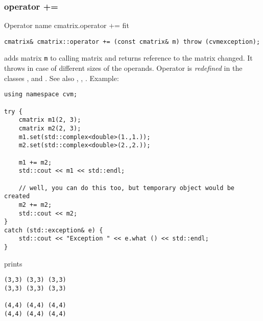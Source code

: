 \subsubsection{operator +=}
Operator%
\pdfdest name {cmatrix.operator +=} fit
\begin{verbatim}
cmatrix& cmatrix::operator += (const cmatrix& m) throw (cvmexception);
\end{verbatim}
adds  matrix \verb"m" to  calling matrix 
and returns  reference to
the matrix changed.
It throws  
in case of different sizes of the operands.
Operator is \emph{redefined} in the classes
,  
and .
See also ,
,
.
Example:
\begin{Verbatim}
using namespace cvm;

try {
    cmatrix m1(2, 3);
    cmatrix m2(2, 3);
    m1.set(std::complex<double>(1.,1.));
    m2.set(std::complex<double>(2.,2.));

    m1 += m2;
    std::cout << m1 << std::endl;

    // well, you can do this too, but temporary object would be created
    m2 += m2; 
    std::cout << m2;
}
catch (std::exception& e) {
    std::cout << "Exception " << e.what () << std::endl;
}
\end{Verbatim}
prints
\begin{Verbatim}
(3,3) (3,3) (3,3)
(3,3) (3,3) (3,3)

(4,4) (4,4) (4,4)
(4,4) (4,4) (4,4)
\end{Verbatim}
\newpage



